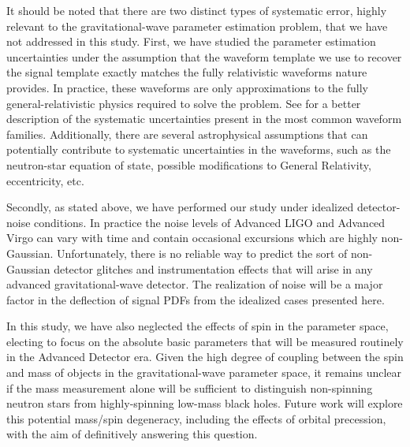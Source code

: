 \documentclass[11pt,a4paper]{emulateapj} 
\begin{document}
It should be noted that there are two distinct types of systematic
error, highly relevant to the gravitational-wave parameter estimation
problem, that we have not addressed in this study.  First, we have
studied the parameter estimation uncertainties under the assumption
that the waveform template we use to recover the signal template
exactly matches the fully relativistic waveforms nature provides.  In
practice, these waveforms are only approximations to the fully
general-relativistic physics required to solve the problem.  See
\cite{BuonannoWaveform} for a better description of the systematic uncertainties
present in the most common waveform families.  Additionally, there are
several astrophysical assumptions that can potentially contribute to
systematic uncertainties in the waveforms, such as the neutron-star
equation of state, possible modifications to General Relativity,
eccentricity, etc.

Secondly, as stated above, we have performed our study under idealized
detector-noise conditions.  In practice the noise levels of Advanced
LIGO and Advanced Virgo can vary with time and contain occasional
excursions which are highly non-Gaussian.  Unfortunately, there is no
reliable way to predict the sort of non-Gaussian detector glitches and
instrumentation effects that will arise in any advanced
gravitational-wave detector.  The realization of noise will be a
major factor in the deflection of signal PDFs from the idealized cases
presented here.

In this study, we have also neglected the effects of spin in the
parameter space, electing to focus on the absolute basic parameters
that will be measured routinely in the Advanced Detector era.  Given
the high degree of coupling between the spin and mass of objects
in the gravitational-wave parameter space, it remains unclear if the
mass measurement alone will be sufficient to distinguish non-spinning
neutron stars from highly-spinning low-mass black holes.  Future work
will explore this potential mass/spin degeneracy, including the
effects of orbital precession, with the aim of definitively answering
this question.

 {}
\end{document}
